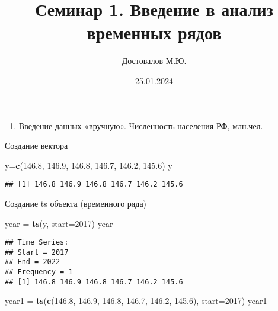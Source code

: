 \documentclass[
]{article}
\title{Семинар 1. Введение в анализ временных рядов}
\author{Достовалов М.Ю.}
\date{25.01.2024}
\newenvironment{Shaded}{\begin{snugshade}}{\end{snugshade}}
\newcommand{\AttributeTok}[1]{\textcolor[rgb]{0.13,0.29,0.53}{#1}}
\newcommand{\DecValTok}[1]{\textcolor[rgb]{0.00,0.00,0.81}{#1}}
\newcommand{\FloatTok}[1]{\textcolor[rgb]{0.00,0.00,0.81}{#1}}
\newcommand{\FunctionTok}[1]{\textcolor[rgb]{0.13,0.29,0.53}{\textbf{#1}}}
\newcommand{\NormalTok}[1]{#1}
\newcommand{\OtherTok}[1]{\textcolor[rgb]{0.56,0.35,0.01}{#1}}
\providecommand{\tightlist}{%
  \setlength{\itemsep}{0pt}\setlength{\parskip}{0pt}}
\begin{document}
\maketitle

\begin{enumerate}
\def\labelenumi{\arabic{enumi}.}
\tightlist
\item
  Введение данных «вручную». Численность населения РФ, млн.чел.
\end{enumerate}

Создание вектора

\begin{Shaded}
\begin{Highlighting}[]
\NormalTok{y}\OtherTok{=}\FunctionTok{c}\NormalTok{(}\FloatTok{146.8}\NormalTok{, }\FloatTok{146.9}\NormalTok{, }\FloatTok{146.8}\NormalTok{, }\FloatTok{146.7}\NormalTok{, }\FloatTok{146.2}\NormalTok{, }\FloatTok{145.6}\NormalTok{)}
\NormalTok{y}
\end{Highlighting}
\end{Shaded}

\begin{verbatim}
## [1] 146.8 146.9 146.8 146.7 146.2 145.6
\end{verbatim}

Создание ts объекта (временного ряда)

\begin{Shaded}
\begin{Highlighting}[]
\NormalTok{year }\OtherTok{=} \FunctionTok{ts}\NormalTok{(y, }\AttributeTok{start=}\DecValTok{2017}\NormalTok{)}
\NormalTok{year}
\end{Highlighting}
\end{Shaded}

\begin{verbatim}
## Time Series:
## Start = 2017 
## End = 2022 
## Frequency = 1 
## [1] 146.8 146.9 146.8 146.7 146.2 145.6
\end{verbatim}

\begin{Shaded}
\begin{Highlighting}[]
\NormalTok{year1 }\OtherTok{=} \FunctionTok{ts}\NormalTok{(}\FunctionTok{c}\NormalTok{(}\FloatTok{146.8}\NormalTok{, }\FloatTok{146.9}\NormalTok{, }\FloatTok{146.8}\NormalTok{, }\FloatTok{146.7}\NormalTok{, }\FloatTok{146.2}\NormalTok{, }\FloatTok{145.6}\NormalTok{), }\AttributeTok{start=}\DecValTok{2017}\NormalTok{)}
\NormalTok{year1}
\end{Highlighting}
\end{Shaded}
\end{document}

